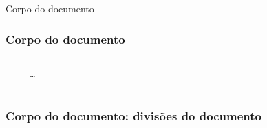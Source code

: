 \begin{frame}[standout]
  \Huge
  Corpo do documento
\end{frame}

\begin{frame}[fragile]
  \frametitle{Corpo do documento}
  \begin{verbatim}
    
     …
    
  \end{verbatim}
\end{frame}

\begin{frame}[fragile]
  \frametitle{Corpo do documento: divisões do documento}
  \large
  \begin{multicols}{2}
  \end{multicols}
\end{frame}

